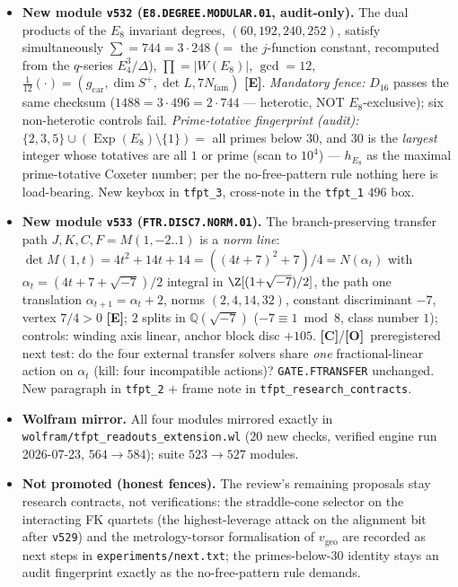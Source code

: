 \documentclass[11pt]{article}
\providecommand{\mE}{\textbf{[E]}}\providecommand{\mC}{\textbf{[C]}}
\providecommand{\mO}{\textbf{[O]}}\providecommand{\mX}{\textbf{[X]}}
\providecommand{\vref}[1]{\texttt{#1}}
\providecommand{\gcar}{g_{\mathrm{car}}}\providecommand{\Nfam}{N_{\mathrm{fam}}}
\begin{document}
\begin{itemize}[leftmargin=1.5em]
clock as \emph{one integer operator}); Ramanujan trace tomography $\operatorname{tr}(T_{30}^k)=c_{30}(k)
=c_5(k)c_6(k)$ for all $k$, signed table $(-1,1,2,4,-2,-4,-8,8)$, atom readout $(2,4,8)=
(|\Z_2|,|\mu_4|,\operatorname{rank}E_8)$; honest kill scope ($\Phi_{15}$ passes the unsigned triple ---
the \emph{signed} table discriminates; $\Phi_{16}/\Phi_{20}/\Phi_{24}$ die on the triple). The flip-atlas
intertwiner (\texttt{COX.FLIP.INTERTWINER}) and Stage B stay \mO; \texttt{tfpt\_1} Stage A prose updated.
\item \textbf{New module \texttt{v532} (\texttt{E8.DEGREE.MODULAR.01}, audit-only).} The dual products of the
$E_8$ invariant degrees, $(60,192,240,252)$, satisfy simultaneously $\sum=744=3\cdot248$ ($=$ the
$j$-function constant, recomputed from the $q$-series $E_4^3/\Delta$), $\prod=|W(E_8)|$, $\gcd=12$,
$\tfrac1{12}(\cdot)=(\gcar,\dim S^+,\det L,7\Nfam)$ \mE. \emph{Mandatory fence:} $D_{16}$ passes the same
checksum ($1488=3\cdot496=2\cdot744$ --- heterotic, NOT $E_8$-exclusive); six non-heterotic controls fail.
\emph{Prime-totative fingerprint (audit):} $\{2,3,5\}\cup(\operatorname{Exp}(E_8)\setminus\{1\})=$ all
primes below $30$, and $30$ is the \emph{largest} integer whose totatives are all $1$ or prime (scan to
$10^4$) --- $h_{E_8}$ as the maximal prime-totative Coxeter number; per the no-free-pattern rule nothing
here is load-bearing. New keybox in \texttt{tfpt\_3}, cross-note in the \texttt{tfpt\_1} $496$ box.
\item \textbf{New module \texttt{v533} (\texttt{FTR.DISC7.NORM.01}).} The branch-preserving transfer path
$J,K,C,F=M(1,-2..1)$ is a \emph{norm line}: $\det M(1,t)=4t^2{+}14t{+}14=((4t{+}7)^2{+}7)/4
=N(\alpha_t)$ with $\alpha_t=(4t{+}7{+}\sqrt{-7})/2$ integral in $\Z[(1{+}\sqrt{-7})/2]$, the path one
translation $\alpha_{t+1}=\alpha_t+2$, norms $(2,4,14,32)$, constant discriminant $-7$, vertex $7/4>0$
\mE; $2$ splits in $\mathbb Q(\sqrt{-7})$ ($-7\equiv1\bmod8$, class number $1$); controls: winding axis linear,
anchor block disc $+105$. \mC/\mO\ preregistered next test: do the four external transfer solvers share
\emph{one} fractional-linear action on $\alpha_t$ (kill: four incompatible actions)?
\texttt{GATE.FTRANSFER} unchanged. New paragraph in \texttt{tfpt\_2} $+$ frame note in
\texttt{tfpt\_research\_contracts}.
\item \textbf{Wolfram mirror.} All four modules mirrored exactly in
\texttt{wolfram/tfpt\_readouts\_extension.wl} ($20$ new checks, verified engine run 2026-07-23,
$564\to584$); suite $523\to527$ modules.
\item \textbf{Not promoted (honest fences).} The review's remaining proposals stay research contracts, not
verifications: the straddle-cone selector on the interacting FK quartets (the highest-leverage attack on
the alignment bit after \vref{v529}) and the metrology-torsor formalisation of $v_{\mathrm{geo}}$ are
recorded as next steps in \texttt{experiments/next.txt}; the primes-below-$30$ identity stays an audit
fingerprint exactly as the no-free-pattern rule demands.
\end{itemize}
\end{document}

